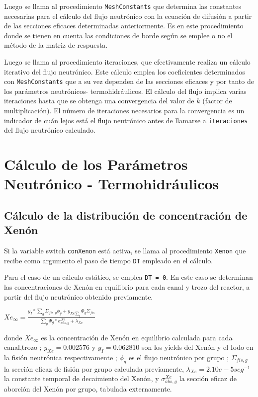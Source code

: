 Luego se llama al procedimiento \texttt{MeshConstants} que determina las constantes necesarias para el cálculo del flujo neutrónico con la ecuación de difusión a partir de las secciones eficaces determinadas anteriormente. Es en este procedimiento donde se tienen en cuenta las condiciones de borde según se emplee o no el método de la matriz de respuesta. 

Luego se llama al procedimiento iteraciones, que efectivamente realiza un cálculo iterativo del flujo neutrónico. Este cálculo emplea los coeficientes determinados con \texttt{MeshConstants} que a su vez dependen de las secciones eficaces y por tanto de los parámetros neutrónicos- termohidráulicos. El cálculo del flujo implica varias iteraciones hasta que se obtenga una convergencia del valor de $k$ (factor de multiplicación). El número de iteraciones necesarios para la convergencia es un indicador de cuán lejos está el flujo neutrónico antes de llamarse a \texttt{iteraciones} del flujo neutrónico calculado.

\section{Cálculo de los Parámetros Neutrónico - Termohidráulicos}

\subsection{Cálculo de la distribución de concentración de Xenón}
Si la variable switch \texttt{conXenon} está activa, se llama al procedimiento \texttt{Xenon} que recibe como argumento el paso de tiempo \texttt{DT} empleado en el cálculo.

Para el caso de un cálculo estático, se emplea \texttt{DT = 0}. En este caso se determinan las concentraciones de Xenón en equilibrio para cada canal y trozo del reactor, a partir del flujo neutrónico obtenido previamente. 

${Xe}_\infty = \frac{y_I *  \sum_g\Sigma_{fis,g}\phi_g + y_{Xe \sum_g }  \Phi_g  \Sigma_{fis}}{\sum_g\Phi_g *\sigma^{Xe}_{abs,g} + \lambda_{Xe}}$

donde ${Xe}_\infty$ es la concentración de Xenón en equilibrio calculada para cada canal,trozo ; $y_{Xe}= 0.002576$ y $y_I=0.062810$ son los yields del Xenón y el Iodo en la fisión neutrónica respectivamente ; $\phi_g$ es el flujo neutrónico por grupo ; $\Sigma_{fis,g}$  la sección eficaz de fisión por grupo calculada previamente, $\lambda_{Xe}=2.10e-5 {seg}^{-1}$ la constante temporal de decaimiento del Xenón, y $\sigma^{Xe}_{abs,g}$ la sección eficaz de aborción del Xenón por grupo, tabulada externamente.

